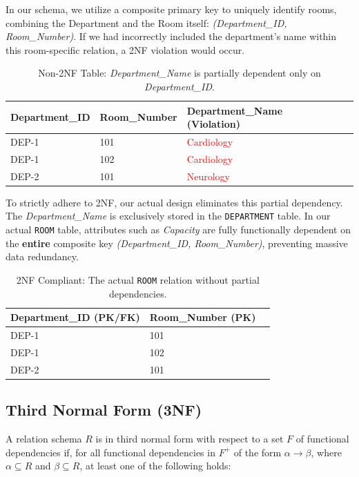 \documentclass[12pt,a4paper]{article}
\begin{document}
In our schema, we utilize a composite primary key to uniquely identify rooms, combining the Department and the Room itself: \textit{(Department\_ID, Room\_Number)}. If we had incorrectly included the department's name within this room-specific relation, a 2NF violation would occur.

\begin{table}[h]
	\centering
	\begin{tabular}{llll}
		\toprule
		\textbf{Department\_ID} & \textbf{Room\_Number} & \textbf{Department\_Name (Violation)} \\
		\midrule
		DEP-1                   & 101                   & \textcolor{red}{Cardiology}           \\
		DEP-1                   & 102                   & \textcolor{red}{Cardiology}           \\
		DEP-2                   & 101                   & \textcolor{red}{Neurology}            \\
		\bottomrule
	\end{tabular}
	\caption{Non-2NF Table: \textit{Department\_Name} is partially dependent only on \textit{Department\_ID}.}
\end{table}
To strictly adhere to 2NF, our actual design eliminates this partial dependency. The \textit{Department\_Name} is exclusively stored in the \texttt{DEPARTMENT} table. In our actual \texttt{ROOM} table, attributes such as \textit{Capacity} are fully functionally dependent on the \textbf{entire} composite key \textit{(Department\_ID, Room\_Number)}, preventing massive data redundancy.

\begin{table}[h]
	\centering
	\begin{tabular}{lll}
		\toprule
		\textbf{Department\_ID (PK/FK)} & \textbf{Room\_Number (PK)} \\
		\midrule
		DEP-1                           & 101                        \\
		DEP-1                           & 102                        \\
		DEP-2                           & 101                        \\
		\bottomrule
	\end{tabular}
	\caption{2NF Compliant: The actual \texttt{ROOM} relation without partial dependencies.}
\end{table}

\subsection{Third Normal Form (3NF)}
A relation schema $R$ is in third normal form with respect to a set $F$ of functional dependencies if, for all functional dependencies in $F^+$ of the form $\alpha \rightarrow \beta$, where $\alpha \subseteq R$ and $\beta \subseteq R$, at least one of the following holds:
\end{document}
